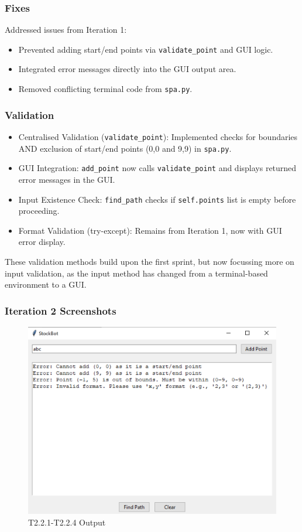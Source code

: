 \subsubsection{Fixes}
Addressed issues from Iteration 1:
\begin{itemize}
	\item Prevented adding start/end points via \verb|validate_point| and GUI logic.
	\item Integrated error messages directly into the GUI output area.
	\item Removed conflicting terminal code from \verb|spa.py|.
\end{itemize}

\subsubsection{Validation}

\begin{itemize}
	\item Centralised Validation (\verb|validate_point|): Implemented checks for boundaries AND exclusion of start/end points (0,0 and 9,9) in \verb|spa.py|.
	\item GUI Integration: \verb|add_point| now calls \verb|validate_point| and displays returned error messages in the GUI.
	\item Input Existence Check: \verb|find_path| checks if \verb|self.points| list is empty before proceeding.
	\item Format Validation (try-except): Remains from Iteration 1, now with GUI error display.
\end{itemize}

These validation methods build upon the first sprint, but now focussing more on input validation, as the input method has changed from a terminal-based environment to a GUI.

\newpage

\subsubsection*{Iteration 2 Screenshots}
\begin{figure}[htbp!]
	\centering
	\includegraphics[width=0.45\linewidth]{Images/t2.2.x.png}
	\caption{T2.2.1-T2.2.4 Output}
	\label{fig:enter-label}
\end{figure}

